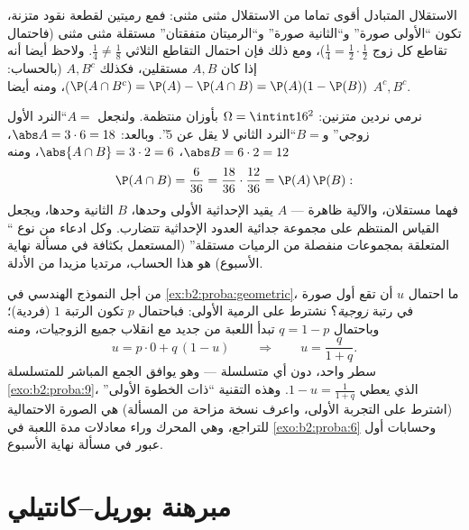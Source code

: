 \begin{remark}
الاستقلال المتبادل أقوى تماما من الاستقلال مثنى مثنى: فمع رميتين
لقطعة نقود متزنة، تكون  ``الأولى صورة'' و``الثانية صورة''
و``الرميتان متفقتان'' مستقلة مثنى مثنى (فاحتمال تقاطع كل زوج $\frac14 =
\frac12\cdot\frac12$)،
ومع ذلك فإن احتمال التقاطع الثلاثي $\frac14 \neq \frac18$. ولاحظ أيضا أنه إذا كان
$A, B$ مستقلين، فكذلك $A, B^c$ (بالحساب: $\P(A \cap B^c) = \P(A) - \P(A\cap B) =
\P(A)(1 - \P(B))$)، ومنه أيضا $A^c, B^c$.
\end{remark}

\begin{example}\label{ex:b2:proba:productindep}
نرمي نردين متزنين: $\Omega = \intint16^2$ بأوزان منتظمة. ولنجعل $A = {}$``النرد
الأول زوجي'' و$B = {}$``النرد الثاني لا يقل عن $5$''. وبالعد:
$\abs A = 3\cdot6 = 18$، $\abs B = 6\cdot2 = 12$، $\abs{A\cap B} = 3\cdot2 = 6$، ومنه
\[
\P(A\cap B) = \frac6{36} = \frac{18}{36}\cdot\frac{12}{36} =
\P(A)\,\P(B) :
\]
فهما مستقلان، والآلية ظاهرة ---  $A$ يقيد الإحداثية الأولى
وحدها،  $B$ الثانية وحدها، ويجعل القياس المنتظم على مجموعة
جدائية العدود الإحداثية تتضارب. وكل ادعاء من نوع `` المتعلقة
بمجموعات منفصلة من الرميات مستقلة'' (المستعمل بكثافة في مسألة نهاية
الأسبوع) هو هذا الحساب، مرتديا مزيدا من الأدلة.
\end{example}

\begin{example}\label{ex:b2:proba:firststep}
من أجل النموذج الهندسي في \cref{ex:b2:proba:geometric}، ما احتمال $u$ أن تقع أول صورة
في رتبة \emph{زوجية}؟ نشترط على الرمية الأولى: فباحتمال $p$ تكون
الرتبة $1$ (فردية)؛ وباحتمال $q = 1 - p$ تبدأ اللعبة من جديد مع انقلاب
جميع الزوجيات، ومنه
\[
u = p\cdot0 + q\,(1 - u)
\qquad\Longrightarrow\qquad
u = \frac{q}{1 + q} .
\]
سطر واحد، دون أي متسلسلة --- وهو يوافق الجمع المباشر للمتسلسلة
\cref{exo:b2:proba:9}، الذي يعطي $1 - u =
\frac1{1+q}$. وهذه التقنية ``ذات الخطوة الأولى'' (اشترط
على التجربة الأولى، واعرف نسخة مزاحة من المسألة) هي الصورة الاحتمالية
للتراجع، وهي المحرك وراء معادلات مدة اللعبة في \cref{exo:b2:proba:6} وحسابات أول
عبور في مسألة نهاية الأسبوع.
\end{example}

\section{مبرهنة بوريل--كانتيلي}

